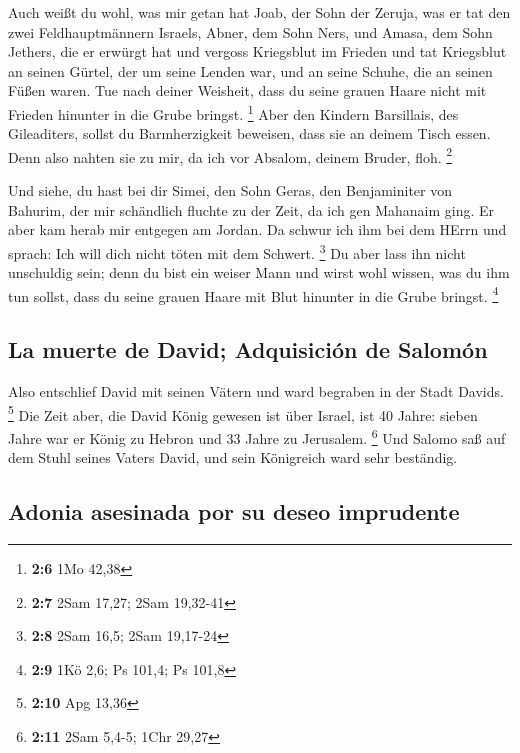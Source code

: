  Auch weißt du wohl, was mir getan hat Joab, der Sohn der
Zeruja, was er tat den zwei Feldhauptmännern Israels, Abner, dem Sohn
Ners, und Amasa, dem Sohn Jethers, die er erwürgt hat und vergoss
Kriegsblut im Frieden und tat Kriegsblut an seinen Gürtel, der um seine
Lenden war, und an seine Schuhe, die an seinen Füßen waren.
 Tue nach deiner Weisheit, dass du seine grauen Haare
nicht mit Frieden hinunter in die Grube bringst. \footnote{\textbf{2:6}
  1Mo 42,38}  Aber den Kindern Barsillais, des
Gileaditers, sollst du Barmherzigkeit beweisen, dass sie an deinem Tisch
essen. Denn also nahten sie zu mir, da ich vor Absalom, deinem Bruder,
floh. \footnote{\textbf{2:7} 2Sam 17,27; 2Sam 19,32-41}

 Und siehe, du hast bei dir Simei, den Sohn Geras, den
Benjaminiter von Bahurim, der mir schändlich fluchte zu der Zeit, da ich
gen Mahanaim ging. Er aber kam herab mir entgegen am Jordan. Da schwur
ich ihm bei dem HErrn und sprach: Ich will dich nicht töten mit dem
Schwert. \footnote{\textbf{2:8} 2Sam 16,5; 2Sam 19,17-24} 
Du aber lass ihn nicht unschuldig sein; denn du bist ein weiser Mann und
wirst wohl wissen, was du ihm tun sollst, dass du seine grauen Haare mit
Blut hinunter in die Grube bringst. \footnote{\textbf{2:9} 1Kö 2,6; Ps
  101,4; Ps 101,8}

\hypertarget{la-muerte-de-david-adquisiciuxf3n-de-salomuxf3n}{%
\subsection{La muerte de David; Adquisición de
Salomón}\label{la-muerte-de-david-adquisiciuxf3n-de-salomuxf3n}}

 Also entschlief David mit seinen Vätern und ward
begraben in der Stadt Davids. \footnote{\textbf{2:10} Apg 13,36}
 Die Zeit aber, die David König gewesen ist über Israel,
ist 40 Jahre: sieben Jahre war er König zu Hebron und 33 Jahre zu
Jerusalem. \footnote{\textbf{2:11} 2Sam 5,4-5; 1Chr 29,27}
 Und Salomo saß auf dem Stuhl seines Vaters David, und
sein Königreich ward sehr beständig.

\hypertarget{adonia-asesinada-por-su-deseo-imprudente}{%
\subsection{Adonia asesinada por su deseo
imprudente}\label{adonia-asesinada-por-su-deseo-imprudente}}

